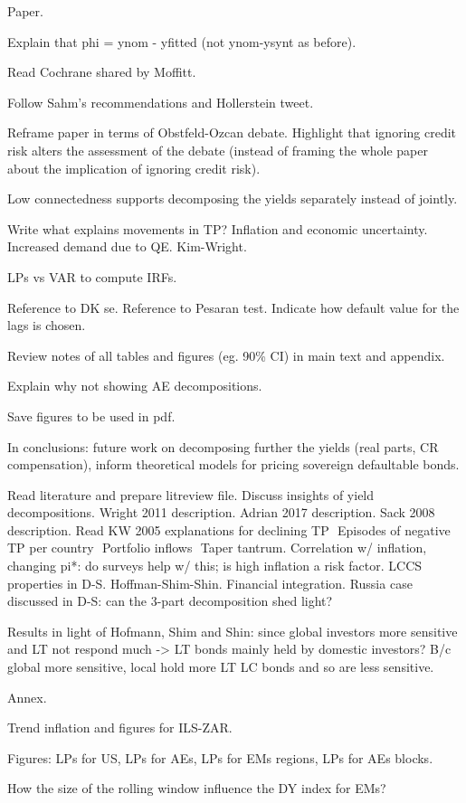 \documentclass[12pt]{article}
\newcommand{\cmark}{\ding{51}}
\newcommand{\done}{\rlap{$\square$}{\raisebox{2pt}{\large\hspace{1pt}\cmark}}%
	\hspace{-2.5pt}}
\begin{document}
\begin{todolist}	
	\item Paper.
	\begin{todolist}
		\item Explain that phi = ynom - yfitted (not ynom-ysynt as before).
		\item Read Cochrane shared by Moffitt.
		\item Follow Sahm's recommendations and Hollerstein tweet.
		\item Reframe paper in terms of Obstfeld-Ozcan debate. Highlight that ignoring credit risk alters the assessment of the debate (instead of framing the whole paper about the implication of ignoring credit risk).
		\item Low connectedness supports decomposing the yields separately instead of jointly.
		\item Write what explains movements in TP? Inflation and economic uncertainty. Increased demand due to QE. Kim-Wright.
		\item LPs vs VAR to compute IRFs.
		\item Reference to DK se. Reference to Pesaran test. Indicate how default value for the lags is chosen.
		\item Review notes of all tables and figures (eg. 90\% CI) in main text and appendix.
		\item Explain why not showing AE decompositions.
		\item Save figures to be used in pdf.
		\item In conclusions: future work on decomposing further the yields (real parts, CR compensation), inform theoretical models for pricing sovereign defaultable bonds.
		\item Read literature and prepare litreview file. Discuss insights of yield decompositions. Wright 2011 description. Adrian 2017 description. Sack 2008 description. Read KW 2005 explanations for declining TP \(<->\) Episodes of negative TP per country \(<->\) Portfolio inflows \(<->\) Taper tantrum. Correlation w/ inflation, changing pi*: do surveys help w/ this; is high inflation a risk factor. LCCS properties in D-S. Hoffman-Shim-Shin. Financial integration. Russia case discussed in D-S: can the 3-part decomposition shed light?
		\item Results in light of Hofmann, Shim and Shin: since global investors more sensitive and LT not respond much -> LT bonds mainly held by domestic investors? B/c global more sensitive, local hold more LT LC bonds and so are less sensitive.
	\end{todolist}
	
	\item Annex.
	\begin{todolist}
		\item[\done] Trend inflation and figures for ILS-ZAR.
		\item Figures: LPs for US, LPs for AEs, LPs for EMs regions, LPs for AEs blocks.
		\item How the size of the rolling window influence the DY index for EMs?
	\end{todolist}
	
\end{todolist}
\end{document}
